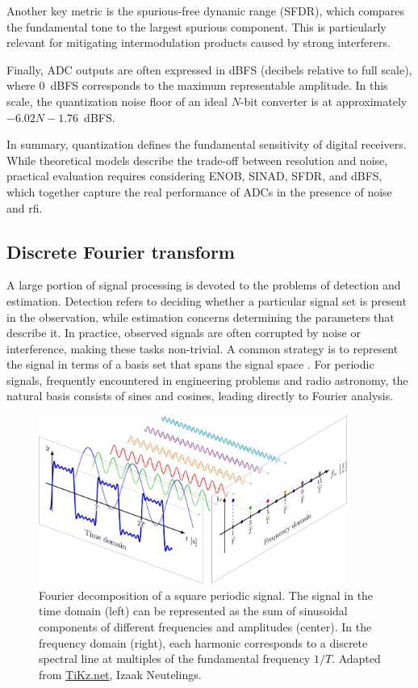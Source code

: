 Another key metric is the spurious-free dynamic range (SFDR), which compares the fundamental tone to the largest spurious component. This is particularly relevant for mitigating intermodulation products caused by strong interferers.  

Finally, ADC outputs are often expressed in dBFS (decibels relative to full scale), where 0~dBFS corresponds to the maximum representable amplitude. In this scale, the quantization noise floor of an ideal $N$-bit converter is at approximately $-6.02N - 1.76$~dBFS.  

In summary, quantization defines the fundamental sensitivity of digital receivers. While theoretical models describe the trade-off between resolution and noise, practical evaluation requires considering ENOB, SINAD, SFDR, and dBFS, which together capture the real performance of ADCs in the presence of noise and \gls{rfi}.

\subsection{Discrete Fourier transform}
\label{sec:dft}
A large portion of signal processing is devoted to the problems of detection and estimation. Detection refers to deciding whether a particular signal set is present in the observation, while estimation concerns determining the parameters that describe it. In practice, observed signals are often corrupted by noise or interference, making these tasks non-trivial. A common strategy is to represent the signal in terms of a basis set that spans the signal space \citep{helstrom1968statistical}. For periodic signals, frequently encountered in engineering problems and radio astronomy, the natural basis consists of sines and cosines, leading directly to Fourier analysis.

\begin{figure}[h!]
	\centering
	\includegraphics[width=0.9\textwidth]{../figures/fourier_series-011.png}
	\caption[Fourier decomposition of a square periodic signal]{Fourier decomposition of a square periodic signal. The signal in the time domain (left) can be represented as the sum of sinusoidal components of different frequencies and amplitudes (center). In the frequency domain (right), each harmonic corresponds to a discrete spectral line at multiples of the fundamental frequency $1/T$. Adapted from \href{https://tikz.net/fourier_series/}{TiKz.net}, Izaak Neutelings.}
	\label{fig:fourier_decomposition}
\end{figure}

